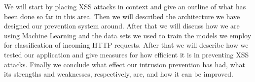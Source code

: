 \documentclass[10pt,journal,compsoc]{IEEEtran}
\begin{document}
We will start by placing XSS attacks in context and give an outline of what has been done so far in this area.
Then we will described the architecture we have designed our prevention system around.
After that we will discuss how we are using Machine Learning and the data sets we used to train the models
we employ for classification of incoming HTTP requests.
After that we will describe how we tested our application and give measures for how efficient it is in preventing XSS
attacks.
Finally we conclude what effect our intrusion prevention has had, what its strengths and weaknesses, respectively, are,
and how it can be improved.







%
%
\end{document}
